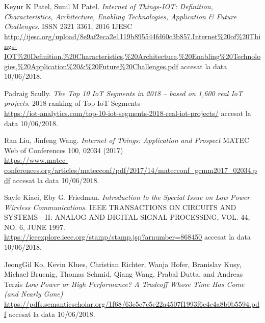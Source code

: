 \documentclass[12pt,a4paper]{report}
\begin{document}
\begin{thebibliography}{9}
Keyur K Patel, Sunil M Patel. 
\textit{Internet of Things-IOT: Definition, Characteristics, Architecture, Enabling Technologies, Application \& Future Challenges}.
ISSN 2321 3361, 2016 IJESC\\
\href{http://ijesc.org/upload/8e9af2eca2e1119b895544fd60c3b857.Internet\%20of\%20Things-IOT\%20Definition,\%20Characteristics,\%20Architecture,\%20Enabling\%20Technologies,\%20Application\%20\&\%20Future\%20Challenges.pdf}{http://ijesc.org/upload/8e9af2eca2e1119b895544fd60c3b857.Internet\%20of\%20Things-IOT\%20Definition,\%20Characteristics,\%20Architecture,\%20Enabling\%20Technologies,\%20Application\%20\&\%20Future\%20Challenges.pdf} accesat la data 10/06/2018.

Padraig Scully.
\textit{The Top 10 IoT Segments in 2018 – based on 1,600 real IoT projects}. 
2018 ranking of Top IoT Segments\\
\href{https://iot-analytics.com/top-10-iot-segments-2018-real-iot-projects/}{https://iot-analytics.com/top-10-iot-segments-2018-real-iot-projects/} accesat la data 10/06/2018.

Ran Liu, Jinfeng Wang.
\textit{Internet of Things: Application and Prospect }
MATEC Web of Conferences 100, 02034 (2017)\\
\href{https://www.matec-conferences.org/articles/matecconf/pdf/2017/14/matecconf\_gcmm2017\_02034.pdf}{https://www.matec-conferences.org/articles/matecconf/pdf/2017/14/matecconf\_gcmm2017\_02034.pdf} accesat la data 10/06/2018.


Sayfe Kiaei, Eby G. Friedman.
\textit{Introduction to the Special Issue on Low Power Wireless Communications}.
IEEE TRANSACTIONS ON CIRCUITS AND SYSTEMS—II: ANALOG AND DIGITAL SIGNAL PROCESSING, VOL. 44, NO. 6, JUNE 1997.\\
\href{https://ieeexplore.ieee.org/stamp/stamp.jsp?arnumber=868450}{https://ieeexplore.ieee.org/stamp/stamp.jsp?arnumber=868450} accesat la data 10/06/2018.

JeongGil Ko, Kevin Klues, Christian Richter, Wanja Hofer, Branislav Kusy, Michael Bruenig, Thomas Schmid, Qiang Wang, Prabal Dutta, and Andreas Terzis
\textit{Low Power or High Performance? A Tradeoff Whose Time Has Come (and Nearly Gone)}\\
\href{https://pdfs.semanticscholar.org/1f68/63c5c7c5e22a4507f1993f6c4c4a8b0b5594.pdf}{https://pdfs.semanticscholar.org/1f68/63c5c7c5e22a4507f1993f6c4c4a8b0b5594.pdf} accesat la data 10/06/2018.


\end{thebibliography}
\end{document}
